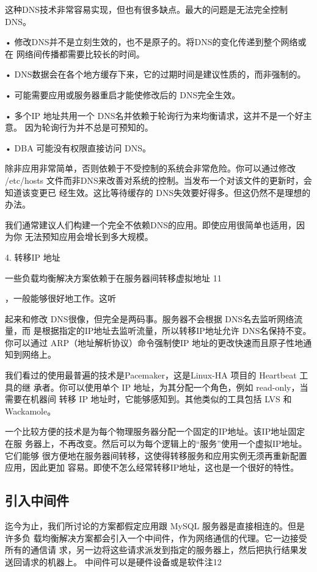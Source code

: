 这种DNS技术非常容易实现，但也有很多缺点。最大的问题是无法完全控制 DNS。

• 修改DNS并不是立刻生效的，也不是原子的。将DNS的变化传递到整个网络或在
网络间传播都需要比较长的时间。

• DNS数据会在各个地方缓存下来，它的过期时间是建议性质的，而非强制的。

• 可能需要应用或服务器重启才能使修改后的 DNS完全生效。

• 多个IP 地址共用一个 DNS名并依赖于轮询行为来均衡请求，这并不是一个好主意。
因为轮询行为并不总是可预知的。

• DBA 可能没有权限直接访问 DNS。

除非应用非常简单，否则依赖于不受控制的系统会非常危险。你可以通过修改 /etc/hosts
文件而非DNS来改善对系统的控制。当发布一个对该文件的更新时，会知道该变更已
经生效。这比等待缓存的 DNS失效要好得多。但这仍然不是理想的办法。

我们通常建议人们构建一个完全不依赖DNS的应用。即使应用很简单也适用，因为你
无法预知应用会增长到多大规模。

4. 转移IP 地址

一些负载均衡解决方案依赖于在服务器间转移虚拟地址 11

，一般能够很好地工作。这听

起来和修改 DNS很像，但完全是两码事。服务器不会根据 DNS名去监听网络流量，而
是根据指定的IP地址去监听流量，所以转移IP地址允许 DNS名保持不变。你可以通过
ARP（地址解析协议）命令强制使IP 地址的更改快速而且原子性地通知到网络上。

我们看过的使用最普遍的技术是Pacemaker，这是Linux-HA 项目的 Heartbeat 工具的继
承者。你可以使用单个 IP 地址，为其分配一个角色，例如 read-only，当需要在机器间
转移 IP 地址时，它能够感知到。其他类似的工具包括 LVS 和 Wackamole。

一个比较方便的技术是为每个物理服务器分配一个固定的IP地址。该IP地址固定在服
务器上，不再改变。然后可以为每个逻辑上的“服务”使用一个虚拟IP地址。它们能够
很方便地在服务器间转移，这使得转移服务和应用实例无须再重新配置应用，因此更加
容易。即使不怎么经常转移IP地址，这也是一个很好的特性。

\subsection{引入中间件}
迄今为止，我们所讨论的方案都假定应用跟 MySQL 服务器是直接相连的。但是许多负
载均衡解决方案都会引入一个中间件，作为网络通信的代理。它一边接受所有的通信请
求，另一边将这些请求派发到指定的服务器上，然后把执行结果发送回请求的机器上。
中间件可以是硬件设备或是软件注12

